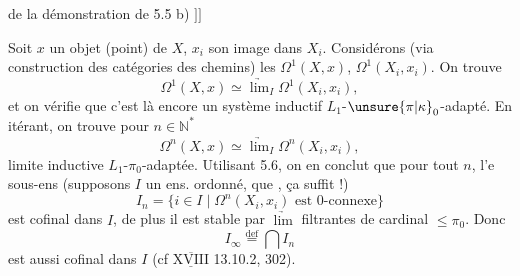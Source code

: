 de la démonstration de 5.5 b) $\big]\!\big]$

Soit $x$ un objet (point) de $X$, $x_i$ son image dans $X_i$. Considérons (via  construction  des catégories des chemins)  les $\Omega^1(X,x)$, $\Omega^1(X_i,x_i)$. On trouve
\[
\Omega^1(X,x)\simeq\underrightarrow{\lim}_{I}\Omega^1(X_i,x_i),
\]
et on vérifie que c'est là encore un système inductif $L_1$-$\unsure{\pi|\kappa}_0$-adapté. En itérant, on trouve pour $n\in\mathbb N^*$
\[
\Omega^n(X,x)\simeq\underrightarrow{\lim}_{I}\Omega^n(X_i,x_i),
\]
limite inductive $L_1$-$\pi_0$-adaptée. Utilisant 5.6, on en conclut que pour
tout $n$, l'e sous-ens (supposons $I$ un ens. ordonné, que  , ça suffit !)
\[
I_n=\{i\in I\mid \Omega^n(X_i,x_i)\text{ est }0\text{-connexe}\}
\]
est cofinal dans $I$, de plus il est stable par $\underrightarrow{\lim}$ filtrantes de cardinal $\leq\pi_0$.
Donc
\[
I_\infty\overset{\mathrm{def}}{=}\bigcap I_n
\]
est aussi cofinal dans $I$ (cf $\overline{\underline{\mathrm{XVIII}}}$ 13.10.2,  302).
